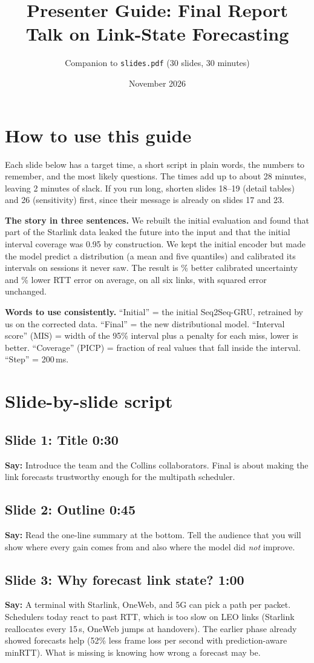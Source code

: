 \documentclass[11pt]{article}
\title{Presenter Guide: Final Report Talk on Link-State Forecasting}
\author{Companion to \texttt{slides.pdf} (30 slides, 30 minutes)}
\date{November 2026}
\newcommand{\slide}[3]{\subsection*{Slide #1: #2 \hfill{\normalsize\color{gray}#3}}}
\newcommand{\say}{\textbf{Say:} }
\begin{document}
\maketitle

\section*{How to use this guide}
Each slide below has a target time, a short script in plain words, the numbers to remember, and the most likely questions. The times add up to about 28 minutes, leaving 2 minutes of slack. If you run long, shorten slides 18--19 (detail tables) and 26 (sensitivity) first, since their message is already on slides 17 and 23.

\textbf{The story in three sentences.} We rebuilt the initial evaluation and found that part of the Starlink data leaked the future into the input and that the initial interval coverage was 0.95 by construction. We kept the initial encoder but made the model predict a distribution (a mean and five quantiles) and calibrated its intervals on sessions it never saw. The result is \ChgMISMean\% better calibrated uncertainty and \ChgMAEMean\% lower RTT error on average, on all six links, with squared error unchanged.

\textbf{Words to use consistently.} ``Initial'' = the initial Seq2Seq-GRU, retrained by us on the corrected data. ``Final'' = the new distributional model. ``Interval score'' (MIS) = width of the 95\% interval plus a penalty for each miss, lower is better. ``Coverage'' (PICP) = fraction of real values that fall inside the interval. ``Step'' = 200\,ms.

\section*{Slide-by-slide script}

\slide{1}{Title}{0:30}
\say Introduce the team and the Collins collaborators. Final is about making the link forecasts trustworthy enough for the multipath scheduler.

\slide{2}{Outline}{0:45}
\say Read the one-line summary at the bottom. Tell the audience that you will show where every gain comes from and also where the model did \emph{not} improve.

\slide{3}{Why forecast link state?}{1:00}
\say A terminal with Starlink, OneWeb, and 5G can pick a path per packet. Schedulers today react to past RTT, which is too slow on LEO links (Starlink reallocates every 15\,s, OneWeb jumps at handovers). The earlier phase already showed forecasts help (52\% less frame loss per second with prediction-aware minRTT). What is missing is knowing how wrong a forecast may be.
\end{document}
